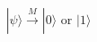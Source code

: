 \documentclass[preview]{standalone}
\begin{document}
\begin{align*}
|\psi\rangle \xrightarrow{M} |0\rangle \text{ or } |1\rangle
\end{align*}
\end{document}
